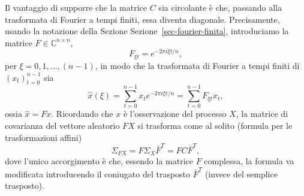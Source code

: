 \documentclass[
  italian,
  letterpaper,
]{book}
\theoremstyle{definition}
\theoremstyle{remark}
\begin{document}
Il vantaggio di supporre che la matrice \(C\) sia circolante è che,
passando alla trasformata di Fourier a tempi finiti, essa diventa
diagonale. Precisamente, usando la notazione della Sezione
Sezione~\ref{sec-fourier-finita}, introduciamo la matrice
\(F \in \mathbb{C}^{n\times n}\), \[ F_{\xi t} = e^{-2 \pi i \xi t/n},\]
per \(\xi = 0,1, \ldots, (n-1)\), in modo che la trasformata di Fourier
a tempi finiti di \((x_t)_{t =0}^{n-1}\) sia
\[\hat x (\xi ) = \sum_{t=0}^{n-1} x_t e^{- 2 \pi i \xi t/n} = \sum_{t=0}^{n-1} F_{\xi t} x_t,\]
ossia \(\hat x = F x\). Ricordando che \(x\) è l'osservazione del
processo \(X\), la matrice di covarianza del vettore aleatorio \(FX\) si
trasforma come al solito (formula per le trasformazioni affini)
\[ \Sigma_{ FX} =  F \Sigma_X \bar{F}^T = FC \bar{F}^T,\] dove l'unico
accorgimento è che, essendo la matrice \(F\) complessa, la formula va
modificata introducendo il coniugato del trasposto \(\bar{F}^T\) (invece
del semplice trasposto).
\end{document}
